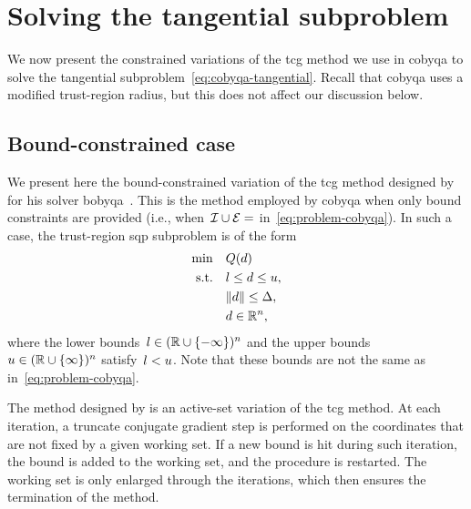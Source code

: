 \section{Solving the tangential subproblem}
\label{sec:cobyqa-tangential}

We now present the constrained variations of the \gls{tcg} method we use in \gls{cobyqa} to solve the tangential subproblem~\cref{eq:cobyqa-tangential}.
Recall that \gls{cobyqa} uses a modified trust-region radius, but this does not affect our discussion below.

\subsection{Bound-constrained case}

We present here the bound-constrained variation of the \gls{tcg} method designed by \citeauthor{Powell_2009} for his solver \gls{bobyqa}~\cite{Powell_2009}.
This is the method employed by \gls{cobyqa} when only bound constraints are provided (i.e., when~$\iub \cup \ieq = \empty$ in~\cref{eq:problem-cobyqa}).
In such a case, the trust-region \gls{sqp} subproblem is of the form
\begin{subequations}
    \label{eq:problem-tcg-bounds}
    \begin{align}
        \min        & \quad Q(\step) \label{eq:problem-tcg-bounds-obj}\\
        \text{s.t.} & \quad \xl \le \step \le \xu,\\
                    & \quad \norm{\step} \le \rad,\\
                    & \quad \step \in \R^n,
    \end{align}
\end{subequations}
where the lower bounds~$l \in (\mathbb{R} \cup \{-\infty\})^n$ and the upper bounds~$u \in (\mathbb{R} \cup \{\infty\})^n$ satisfy~$l < u$.
Note that these bounds are not the same as in~\cref{eq:problem-cobyqa}.

The method designed by \citeauthor{Powell_2009} is an active-set variation of the \gls{tcg} method.
At each iteration, a truncate conjugate gradient step is performed on the coordinates that are not fixed by a given working set.
If a new bound is hit during such iteration, the bound is added to the working set, and the procedure is restarted.
The working set is only enlarged through the iterations, which then ensures the termination of the method.

